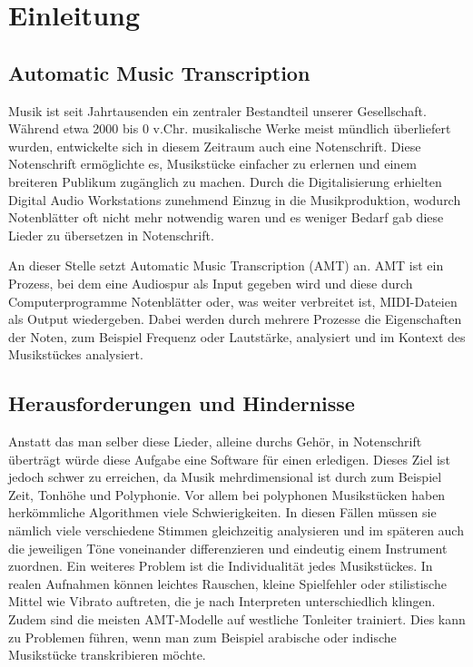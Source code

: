 \section{Einleitung}

\subsection{Automatic Music Transcription}
Musik ist seit Jahrtausenden ein zentraler Bestandteil unserer Gesellschaft.
Während etwa 2000 bis 0 v.Chr. musikalische Werke meist mündlich überliefert wurden,
entwickelte sich in diesem Zeitraum auch eine Notenschrift.
Diese Notenschrift ermöglichte es, Musikstücke einfacher zu erlernen und einem breiteren Publikum zugänglich zu machen.
Durch die Digitalisierung erhielten Digital Audio Workstations zunehmend Einzug in die Musikproduktion,
wodurch Notenblätter oft nicht mehr notwendig waren und es weniger Bedarf gab diese Lieder zu übersetzen in Notenschrift.

An dieser Stelle setzt Automatic Music Transcription (AMT) an.
AMT ist ein Prozess, bei dem eine Audiospur als Input gegeben wird und diese durch Computerprogramme
Notenblätter oder, was weiter verbreitet ist, MIDI-Dateien als Output wiedergeben.
Dabei werden durch mehrere Prozesse die Eigenschaften der Noten, zum Beispiel Frequenz oder Lautstärke,
analysiert und im Kontext des Musikstückes analysiert.

\subsection{Herausforderungen und Hindernisse}
Anstatt das man selber diese Lieder, alleine durchs Gehör,
in Notenschrift überträgt würde diese Aufgabe eine Software für einen erledigen.
Dieses Ziel ist jedoch schwer zu erreichen,
da Musik mehrdimensional ist durch zum Beispiel Zeit, Tonhöhe und Polyphonie.
Vor allem bei polyphonen Musikstücken haben herkömmliche Algorithmen viele Schwierigkeiten.
In diesen Fällen müssen sie nämlich viele verschiedene Stimmen gleichzeitig analysieren und
im späteren auch die jeweiligen Töne voneinander differenzieren und eindeutig einem Instrument zuordnen.
Ein weiteres Problem ist die Individualität jedes Musikstückes.
In realen Aufnahmen können leichtes Rauschen,
kleine Spielfehler oder stilistische Mittel wie Vibrato auftreten,
die je nach Interpreten unterschiedlich klingen.
Zudem sind die meisten AMT-Modelle auf westliche Tonleiter trainiert.
Dies kann zu Problemen führen, wenn man zum Beispiel
arabische oder indische Musikstücke transkribieren möchte.

